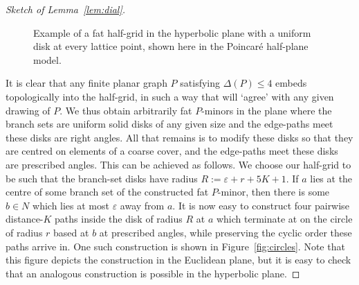 \documentclass[10pt,a4paper]{amsart}
\theoremstyle{definition}
\begin{document}
\begin{proof}[Sketch of Lemma~\ref{lem:dial}]
\begin{figure}[t]
\begin{tikzpicture}[x=0.75pt,y=0.75pt,yscale=-1,xscale=1]
\end{tikzpicture}
		\caption{Example of a fat half-grid in the hyperbolic plane with a uniform disk at every lattice point, shown here in the Poincar\'e half-plane model. }
		\label{fig:half-plane}
	\end{figure}

It is clear that any finite planar graph $P$ satisfying $\Delta(P) \leq 4$ embeds topologically into the half-grid, in such a way that will `agree' with any given drawing of $P$.  We thus obtain arbitrarily fat $P$-minors in the plane where the branch sets are uniform solid disks of any given size and the edge-paths meet these disks are right angles. All that remains is to modify these disks so that they are centred on elements of a coarse cover, and the edge-paths meet these disks are prescribed angles. 
This can be achieved as follows. We choose our half-grid to be such that the branch-set disks have radius $R := \varepsilon+r + 5K + 1$. If $a$ lies at the centre of some branch set of the constructed fat $P$-minor, then there is some $b \in N$ which lies at most $\varepsilon$ away from $a$. It is now easy to construct four pairwise distance-$K$ paths inside the disk of radius $R$ at $a$ which terminate at on the circle of radius $r$ based at $b$ at prescribed angles, while preserving the cyclic order these paths arrive in. One such construction is shown in Figure~\ref{fig:circles}. Note that this figure depicts the construction in the Euclidean plane, but it is easy to check that an analogous construction is possible in the hyperbolic plane. 
\end{proof}
	
\end{document}
